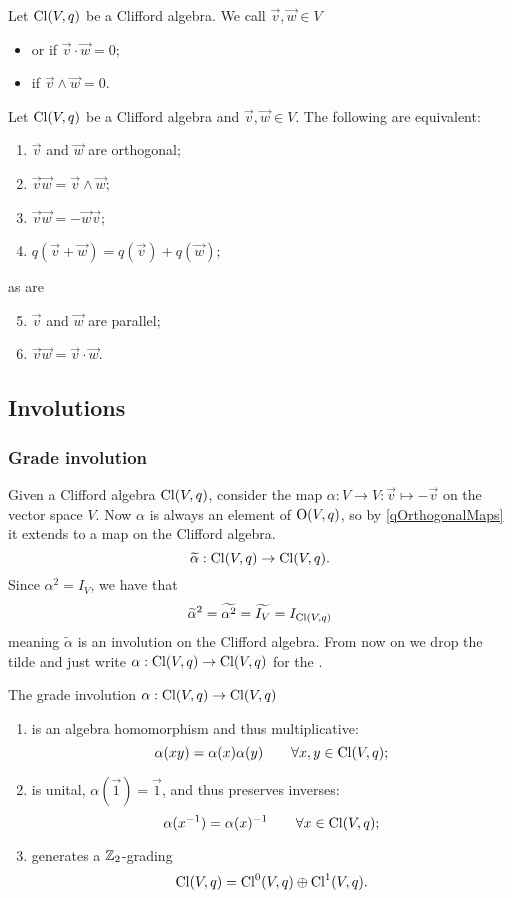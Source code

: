 \begin{definition}
Let $\operatorname{Cl}(V,q)$ be a Clifford algebra. We call $\vec{v},\vec{w}\in V$
\begin{itemize}
\item {} or  if $\vec{v}\cdot \vec{w} = 0$;
\item {} if $\vec{v}\wedge \vec{w} = 0$.
\end{itemize}
\end{definition}
\begin{lemma}
Let $\operatorname{Cl}(V,q)$ be a Clifford algebra and $\vec{v},\vec{w}\in V$. The following are equivalent:
\begin{enumerate}
\item $\vec{v}$ and $\vec{w}$ are orthogonal;
\item $\vec{v}\vec{w} = \vec{v}\wedge \vec{w}$;
\item $\vec{v}\vec{w} = -\vec{w}\vec{v}$;
\item $q(\vec{v}+\vec{w}) = q(\vec{v})+ q(\vec{w})$;
\end{enumerate}
as are
\begin{enumerate} \setcounter{enumi}{4}
\item $\vec{v}$ and $\vec{w}$ are parallel;
\item $\vec{v}\vec{w} = \vec{v}\cdot \vec{w}$.
\end{enumerate}
\end{lemma}


\subsection{Involutions}
\subsubsection{Grade involution}
Given a Clifford algebra $\operatorname{Cl}(V,q)$, consider the map $\alpha: V \to V: \vec{v}\mapsto -\vec{v}$ on the vector space $V$.
Now $\alpha$ is always an element of $\operatorname{O}(V,q)$, so by \ref{qOrthogonalMaps} it extends to a map on the Clifford algebra.
\[ \widetilde{\alpha}: \operatorname{Cl}(V,q) \to \operatorname{Cl}(V,q). \]
Since $\alpha^2 = I_V$, we have that
\[ \widetilde{\alpha}^2 = \widetilde{\alpha^2} = \widetilde{I_V} = I_{\operatorname{Cl}(V,q)} \]
meaning $\widetilde{\alpha}$ is an involution on the Clifford algebra. From now on we drop the tilde and just write $\alpha: \operatorname{Cl}(V,q) \to \operatorname{Cl}(V,q)$ for the .

\begin{lemma}
The grade involution $\alpha: \operatorname{Cl}(V,q) \to \operatorname{Cl}(V,q)$
\begin{enumerate}
\item is an algebra homomorphism and thus multiplicative:
\[ \alpha(xy) = \alpha(x)\alpha(y) \qquad\forall x,y\in \operatorname{Cl}(V,q); \]
\item is unital, $\alpha(\vec{1}) = \vec{1}$, and thus preserves inverses:
\[ \alpha(x^{-1}) = \alpha(x)^{-1} \qquad\forall x\in \operatorname{Cl}(V,q); \]
\item generates a $\mathbb{Z}_2$-grading 
\[ \operatorname{Cl}(V,q) = \operatorname{Cl}^0(V,q)\oplus \operatorname{Cl}^1(V,q). \]
\end{enumerate}
\end{lemma}

